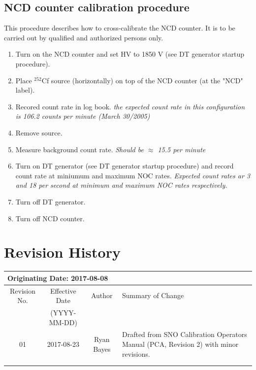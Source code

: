 \documentclass[10pt]{article}
\begin{document}
\subsection{ NCD counter calibration procedure}

This procedure describes how to cross-calibrate the NCD counter. It is to be carried out by qualified and authorized persons only.
\begin{enumerate}
\item \CheckBox[name=ncdcc1]{} Turn on the NCD counter and set HV to 1850 V (see DT generator startup procedure).
\item \CheckBox[name=ncdcc2]{} Place $^252$Cf source (horizontally) on top of the NCD counter (at the "NCD" label).
\item \CheckBox[name=ncdcc3]{} Recored count rate in log book. {\it the expected count rate in this configuration is 106.2 counts per minute (March 30/2005)}
\item \CheckBox[name=ncdcc4]{} Remove source.
\item \CheckBox[name=ncdcc5]{} Measure background count rate.  {\it Should be $\approx$ 15.5 per minute}
\item \CheckBox[name=ncdcc6]{} Turn on DT generator (see DT generator startup procedure) and record count rate at miniumum and maximum NOC rates. {\it Expected count rates ar 3 and 18 per second at minimum and maximum NOC rates respectively.}
\item \CheckBox[name=ncdcc7]{} Turn off DT generator.
\item \CheckBox[name=ncdcc8]{} Turn off NCD counter.
\end{enumerate}

\section{Revision History}
\begin{tabular}{|c|c|c|p{6cm}|}
\hline\hline
\multicolumn{4}{|l|}{Originating Date: 2017-08-08}\\
\hline
Revision No. & Effective Date & Author & Summary of Change \\
& (YYYY-MM-DD) & & \\
\hline
01 & 2017-08-23 & Ryan Bayes & Drafted from SNO Calibration Operators Manual (PCA, Revision 2) with minor revisions.\\
\hline
& & & \\
\hline
& & & \\
\hline \hline

\end{tabular}
\end{document}
